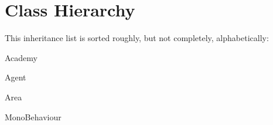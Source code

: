 \section{Class Hierarchy}
This inheritance list is sorted roughly, but not completely, alphabetically\+:\begin{DoxyCompactList}
\item Academy\begin{DoxyCompactList}
\item {}
\item {}
\end{DoxyCompactList}
\item Agent\begin{DoxyCompactList}
\item {}
\item {}
\end{DoxyCompactList}
\item Area\begin{DoxyCompactList}
\item {}
\end{DoxyCompactList}
\item Mono\+Behaviour\begin{DoxyCompactList}
\item {}
\end{DoxyCompactList}
\end{DoxyCompactList}
